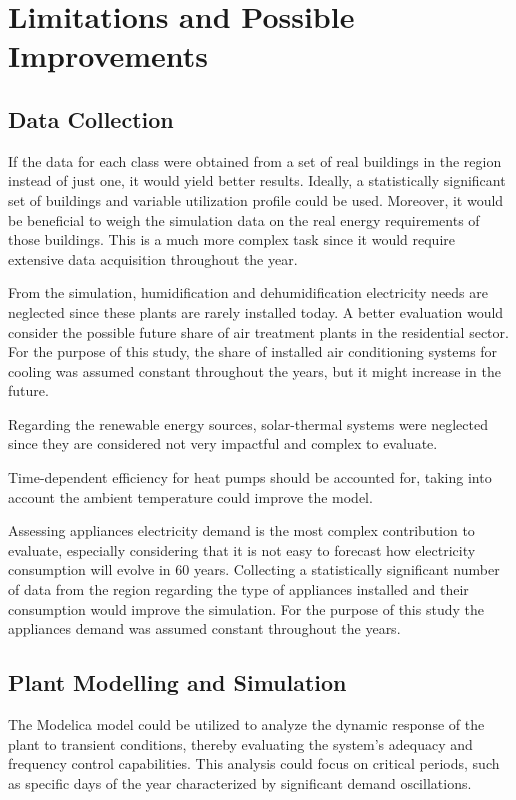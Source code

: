 \section{Limitations and Possible Improvements}
\subsection{Data Collection}
If the data for each class were obtained from a set of real buildings in the region instead of just one, it would yield better results. Ideally, a statistically significant set of buildings and variable utilization profile could be used. Moreover, it would be beneficial to weigh the simulation data on the real energy requirements of those buildings. This is a much more complex task since it would require extensive data acquisition throughout the year.

From the simulation, humidification and dehumidification electricity needs are neglected since these plants are rarely installed today. A better evaluation would consider the possible future share of air treatment plants in the residential sector. For the purpose of this study, the share of installed air conditioning systems for cooling was assumed constant throughout the years, but it might increase in the future.

Regarding the renewable energy sources, solar-thermal systems were neglected since they are considered not very impactful and complex to evaluate.

Time-dependent efficiency for heat pumps should be accounted for, taking into account the ambient temperature could improve the model.

Assessing appliances electricity demand is the most complex contribution to evaluate, especially considering that it is not easy to forecast how electricity consumption will evolve in 60 years. Collecting a statistically significant number of data from the region regarding the type of appliances installed and their consumption would improve the simulation.
For the purpose of this study the appliances demand was assumed constant throughout the years.

\subsection{Plant Modelling and Simulation}
The Modelica model could be utilized to analyze the dynamic response of the plant to transient conditions, thereby evaluating the system's adequacy and frequency control capabilities. This analysis could focus on critical periods, such as specific days of the year characterized by significant demand oscillations.

